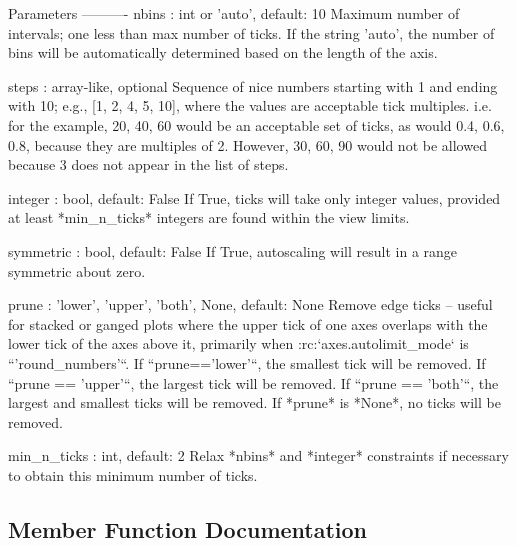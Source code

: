 \begin{DoxyVerb}Parameters
----------
nbins : int or 'auto', default: 10
    Maximum number of intervals; one less than max number of
    ticks.  If the string 'auto', the number of bins will be
    automatically determined based on the length of the axis.

steps : array-like, optional
    Sequence of nice numbers starting with 1 and ending with 10;
    e.g., [1, 2, 4, 5, 10], where the values are acceptable
    tick multiples.  i.e. for the example, 20, 40, 60 would be
    an acceptable set of ticks, as would 0.4, 0.6, 0.8, because
    they are multiples of 2.  However, 30, 60, 90 would not
    be allowed because 3 does not appear in the list of steps.

integer : bool, default: False
    If True, ticks will take only integer values, provided at least
    *min_n_ticks* integers are found within the view limits.

symmetric : bool, default: False
    If True, autoscaling will result in a range symmetric about zero.

prune : {'lower', 'upper', 'both', None}, default: None
    Remove edge ticks -- useful for stacked or ganged plots where
    the upper tick of one axes overlaps with the lower tick of the
    axes above it, primarily when :rc:`axes.autolimit_mode` is
    ``'round_numbers'``.  If ``prune=='lower'``, the smallest tick will
    be removed.  If ``prune == 'upper'``, the largest tick will be
    removed.  If ``prune == 'both'``, the largest and smallest ticks
    will be removed.  If *prune* is *None*, no ticks will be removed.

min_n_ticks : int, default: 2
    Relax *nbins* and *integer* constraints if necessary to obtain
    this minimum number of ticks.
\end{DoxyVerb}
 

\subsection{Member Function Documentation}
\mbox{\label{classmatplotlib_1_1ticker_1_1MaxNLocator_ac25f6a562c7444d0f940fd1f5eccebae}} 
